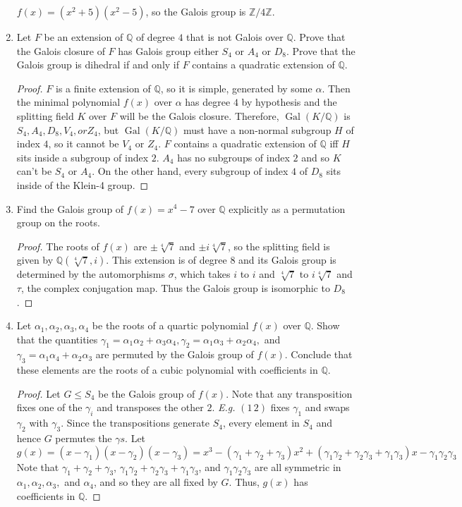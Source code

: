 \documentclass{report}
\newcommand{\Z}{\mathbb{Z}}
\newcommand{\Q}{\mathbb{Q}}
\DeclareMathOperator{\Gal}{Gal}
\begin{document}
\begin{enumerate}
		$f(x)=(x^2+5)(x^2-5)$, so the Galois group is $\Z / 4\Z$.
		\setcounter{enumi}{10}
	\item Let $F$ be an extension of $\Q$ of degree $4$ that is not Galois over $\Q$. Prove that the Galois closure of $F$ has Galois group either $S_4$ or $A_4$ or $D_8$.
		Prove that the Galois group is dihedral if and only if $F$ contains a quadratic extension of $\Q$.
		\begin{proof}
			$F$ is a finite extension of $\Q$, so it is simple, generated by some $\alpha$. Then the minimal polynomial $f(x)$ over $\alpha$ has degree $4$ by hypothesis
			and the splitting field $K$ over $F$ will be the Galois closure. Therefore, $\Gal(K / \Q)$ is $S_4, A_4, D_8, V_4, or Z_4$, but 
			$\Gal (K /\Q)$ must have a non-normal subgroup $H$ of index $4$, so it cannot be $V_4$ or $Z_4$.
			$F$ contains a quadratic extension of $\Q$ iff $H$ sits inside a subgroup of index $2$. 
			$A_4$ has no subgroups of index $2$ and so $K$ can't be $S_4$ or $A_4$. On the other hand, 
			every subgroup of index $4$ of $D_8$ sits inside of the Klein-4 group.
		\end{proof}
		\setcounter{enumi}{16}
	\item Find the Galois group of $f(x)=x^4-7$ over $\Q$ explicitly as a permutation group on the roots.
		\begin{proof}
			 The roots of $f(x)$ are $\pm\sqrt[4]{7}$ and $\pm i \sqrt[4]{7}$, so the splitting field is given by $\Q(\sqrt[4]{7},i)$.
			 This extension is of degree $8$ and its Galois group is determined by the automorphisms $\sigma$, which takes $i$ to $i$ and $\sqrt[4]{7}$ to $i\sqrt[4]{7}$
			 and $\tau$, the complex conjugation map. Thus the Galois group is isomorphic to $D_8$.
		\end{proof}
		
		\setcounter{enumi}{43}
	\item Let $\alpha_1,\alpha_2,\alpha_3,\alpha_4$ be the roots of a quartic polynomial $f(x)$ over $\Q$.
		Show that the quantities $\gamma_1=\alpha_1\alpha_2+\alpha_3\alpha_4, \gamma_2=\alpha_1\alpha_3+\alpha_2\alpha_4,$ and $\gamma_3=\alpha_1\alpha_4+\alpha_2\alpha_3$ are permuted
		by the Galois group of $f(x)$. Conclude that these elements are the roots of a cubic polynomial with coefficients in $\Q$.
		\begin{proof}
			 Let $G\leq S_4$ be the Galois group of $f(x)$. Note that any transposition fixes one of the $\gamma_i$ and transposes the other $2$.
			 \textit{E.g.} $(1\, 2)$ fixes $\gamma_1$ and swaps $\gamma_2$ with $\gamma_3$. Since the transpositions generate $S_4$,
			 every element in $S_4$ and hence $G$ permutes the $\gamma s$. Let 
			 $$g(x)=(x-\gamma_1)(x-\gamma_2)(x-\gamma_3)=x^3-(\gamma_1+\gamma_2+\gamma_3)x^2 + (\gamma_1\gamma_2+\gamma_2\gamma_3+\gamma_1\gamma_3)x -\gamma_1\gamma_2\gamma_3$$
			 Note that $\gamma_1+\gamma_2+\gamma_3$, $\gamma_1\gamma_2+\gamma_2\gamma_3+\gamma_1\gamma_3$, and $\gamma_1\gamma_2\gamma_3$ 
			 are all symmetric in $\alpha_1, \alpha_2, \alpha_3,$ and $\alpha_4$, and so they are all fixed by $G$.
			 Thus, $g(x)$ has coefficients in $\Q$.
		\end{proof}
		

\end{enumerate}
\end{document}
